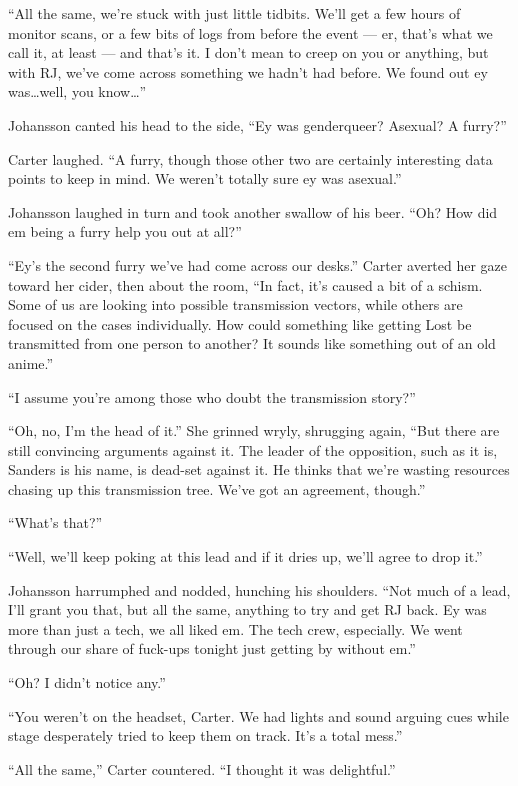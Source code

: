 ``All the same, we're stuck with just little tidbits. We'll get a few hours of monitor scans, or a few bits of logs from before the event --- er, that's what we call it, at least --- and that's it. I don't mean to creep on you or anything, but with RJ, we've come across something we hadn't had before. We found out ey was\ldots{}well, you know\ldots{}''

Johansson canted his head to the side, ``Ey was genderqueer? Asexual? A furry?''

Carter laughed. ``A furry, though those other two are certainly interesting data points to keep in mind. We weren't totally sure ey was asexual.''

Johansson laughed in turn and took another swallow of his beer. ``Oh? How did em being a furry help you out at all?''

``Ey's the second furry we've had come across our desks.'' Carter averted her gaze toward her cider, then about the room, ``In fact, it's caused a bit of a schism. Some of us are looking into possible transmission vectors, while others are focused on the cases individually. How could something like getting Lost be transmitted from one person to another? It sounds like something out of an old anime.''

``I assume you're among those who doubt the transmission story?''

``Oh, no, I'm the head of it.'' She grinned wryly, shrugging again, ``But there are still convincing arguments against it. The leader of the opposition, such as it is, Sanders is his name, is dead-set against it. He thinks that we're wasting resources chasing up this transmission tree. We've got an agreement, though.''

``What's that?''

``Well, we'll keep poking at this lead and if it dries up, we'll agree to drop it.''

Johansson harrumphed and nodded, hunching his shoulders. ``Not much of a lead, I'll grant you that, but all the same, anything to try and get RJ back. Ey was more than just a tech, we all liked em. The tech crew, especially. We went through our share of fuck-ups tonight just getting by without em.''

``Oh? I didn't notice any.''

``You weren't on the headset, Carter. We had lights and sound arguing cues while stage desperately tried to keep them on track. It's a total mess.''

``All the same,'' Carter countered. ``I thought it was delightful.''

